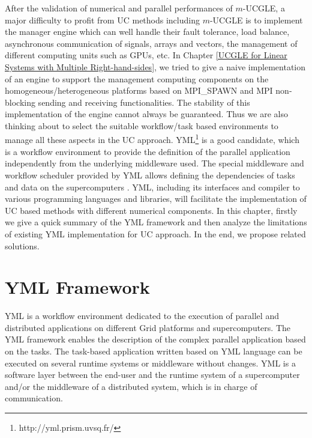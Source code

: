 \begin{displayquote}
	\textsf{After the validation of numerical and parallel performances of $m$-UCGLE, a major difficulty to profit from UC methods including $m$-UCGLE is to implement the manager engine which can well handle their fault tolerance, load balance, asynchronous communication of signals, arrays and vectors, the management of different computing units such as GPUs, etc. In Chapter \ref{UCGLE for Linear Systems with Multiple Right-hand-sides}, we tried to give a naive implementation of an engine to support the management computing components on the homogeneous/heterogeneous platforms based on MPI\_SPAWN and MPI non-blocking sending and receiving functionalities. The stability of this implementation of the engine cannot always be guaranteed. Thus we are also thinking about to select the suitable workflow/task based environments to manage all these aspects in the UC approach. YML\footnote{http://yml.prism.uvsq.fr/} is a good candidate, which is a workflow environment to provide the definition of the parallel application independently from the underlying middleware used. The special middleware and workflow scheduler provided by YML allows defining the dependencies of tasks and data on the supercomputers \cite{delannoyyml}. YML, including its interfaces and compiler to various programming languages and libraries, will facilitate the implementation of UC based methods with different numerical components. In this chapter, firstly we give a quick summary of the YML framework and then analyze the limitations of existing YML implementation for UC approach. In the end, we propose related solutions.}
\end{displayquote}

\vspace{0.6in}


\section{YML Framework}

YML is a workflow environment dedicated to the execution of parallel and distributed applications on different Grid platforms and supercomputers. The YML framework enables the description of the complex parallel application based on the tasks. The task-based application written based on YML language can be executed on several runtime systems or middleware without changes. YML is a software layer between the end-user and the runtime system of a supercomputer and/or the middleware of a distributed system, which is in charge of communication. 

